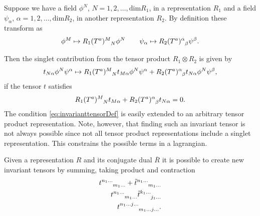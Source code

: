 \documentclass[11pt]{report}
\begin{document}
Suppose we have a field $\phi^N$, $N=1,2,\ldots,\text{dim}R_1$, in a representation $R_1$ and a field $\psi_\alpha$, $\alpha=1,2,\ldots,\text{dim}R_2$, in another representation $R_2$. By definition these transform as 
\begin{equation}
    \phi^M \mapsto \tensor{R_1(T^a)}{^M_N}\phi^N \qquad \psi_\alpha\mapsto \tensor{R_2(T^a)}{^\alpha_\beta}\psi^\beta.
\end{equation}

Then the singlet contribution from the tensor product $R_1\otimes R_2$ is given by 
\begin{equation}
    t_{N\alpha}\phi^N\psi^\alpha \mapsto \tensor{R_1(T^a)}{^M_N}t_{M\alpha}\phi^N\psi^\alpha+\tensor{R_2(T^a)}{^\alpha_\beta}t_{N\alpha}\phi^N\psi^\beta ,
\end{equation}
if the tensor $t$ satisfies
\begin{equation}\label{eq:invarianttensorDef}
    \tensor{R_1(T^a)}{^M_N}t_{M\alpha}+\tensor{R_2(T^a)}{^\alpha_\beta}t_{N\alpha} = 0.
\end{equation}
The condition \eqref{eq:invarianttensorDef} is easily extended to an arbitrary tensor product representation. Note, however, that finding such an invariant tensor is not always possible since not all tensor product representations include a singlet representation. This constrains the possible terms in a lagrangian. 

Given a representation $R$ and its conjugate dual $\overbar{R}$ it is possible to create new invariant tensors by summing, taking product and contraction
\begin{equation}
\begin{aligned}
\tensor{t}{^{n_1\ldots}_{m_1\ldots}}+\tensor{\tilde{t}}{^{n_1\ldots}_{m_1\ldots}}\\
\tensor{t}{^{n_1\ldots}_{m_1\ldots}}\tensor{\tilde{t}}{^{k_1\ldots}_{j_1\ldots}}\\
\tensor{t}{^{n_1\ldots j\ldots}_{m_1\ldots j\ldots}}.
\end{aligned}
\end{equation}
\end{document}
